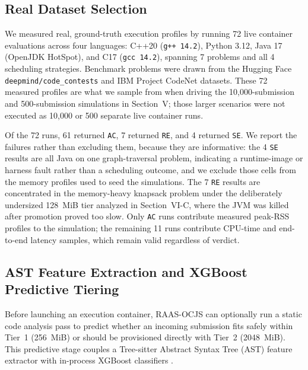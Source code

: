 \documentclass[conference]{IEEEtran}
\begin{document}
\subsection{Real Dataset Selection}
We measured real, ground-truth execution profiles by running 72 live container evaluations across four languages: C++20 (\texttt{g++ 14.2}), Python 3.12, Java 17 (OpenJDK HotSpot), and C17 (\texttt{gcc 14.2}), spanning 7 problems and all 4 scheduling strategies. Benchmark problems were drawn from the Hugging Face \texttt{deepmind/code\_contests} \cite{li2022alphacode} and IBM Project CodeNet \cite{puri2021codenet} datasets. These 72 measured profiles are what we sample from when driving the 10,000-submission and 500-submission simulations in Section~V; those larger scenarios were not executed as 10,000 or 500 separate live container runs.

Of the 72 runs, 61 returned \texttt{AC}, 7 returned \texttt{RE}, and 4 returned \texttt{SE}. We report the failures rather than excluding them, because they are informative: the 4 \texttt{SE} results are all Java on one graph-traversal problem, indicating a runtime-image or harness fault rather than a scheduling outcome, and we exclude those cells from the memory profiles used to seed the simulations. The 7 \texttt{RE} results are concentrated in the memory-heavy knapsack problem under the deliberately undersized 128~MiB tier analyzed in Section~VI-C, where the JVM was killed after promotion proved too slow. Only \texttt{AC} runs contribute measured peak-RSS profiles to the simulation; the remaining 11 runs contribute CPU-time and end-to-end latency samples, which remain valid regardless of verdict.



\subsection{AST Feature Extraction and XGBoost Predictive Tiering}
Before launching an execution container, RAAS-OCJS can optionally run a static code analysis pass to predict whether an incoming submission fits safely within Tier~1 (256~MiB) or should be provisioned directly with Tier~2 (2048~MiB). This predictive stage couples a Tree-sitter Abstract Syntax Tree (AST) feature extractor with in-process XGBoost classifiers \cite{chen2016xgboost}.
\end{document}

